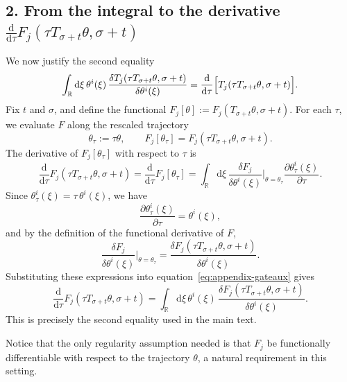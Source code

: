 \documentclass{article} %
\def\eqref#1{equation~\ref{#1}}
\begin{document}
\subsection*{2. From the integral to the derivative
$\frac{\mathrm{d}}{\mathrm{d}\tau}F_j(\tau T_{\sigma+t}\theta,\sigma+t)$}
We now justify the second equality
\[
\int_{\mathbb{R}} \mathrm{d}\xi \,
 \theta^i(\xi)\,
 \frac{\delta T_j(\tau T_{\sigma + t} \theta,\sigma+t)}{\delta \theta^i(\xi)}
 =
 \frac{\mathrm{d}}{\mathrm{d}\tau}
 \Bigl[T_j(\tau T_{\sigma + t}\theta, \sigma + t)\Bigr].
\]
Fix $t$ and $\sigma$, and define the functional $F_j[\theta] := F_j(T_{\sigma + t}\theta, \sigma + t).$ For each $\tau$, we evaluate $F$ along the rescaled trajectory
\[
\theta_\tau := \tau \theta, \qquad
F_j[\theta_\tau] = F_j(\tau T_{\sigma + t}\theta, \sigma + t).
\]
The derivative of $F_j[\theta_\tau]$ with respect to $\tau$ is
\begin{equation}
\frac{\mathrm{d}}{\mathrm{d}\tau} F_j(\tau T_{\sigma + t}\theta, \sigma + t)
=
\frac{\mathrm{d}}{\mathrm{d}\tau} F_j[\theta_\tau]
=
\int_{\mathbb{R}} \mathrm{d}\xi \,
\frac{\delta F_j}{\delta\theta^i(\xi)}\bigg|_{\theta=\theta_\tau}
\frac{\partial\theta_\tau^i(\xi)}{\partial\tau}.
\label{eq:appendix-gateaux}
\end{equation}
Since $\theta_\tau^i(\xi) = \tau\,\theta^i(\xi)$, we have
\[
\frac{\partial\theta_\tau^i(\xi)}{\partial\tau} = \theta^i(\xi),
\]
and by the definition of the functional derivative of $F$,
\[
\frac{\delta F_j}{\delta\theta^i(\xi)}\bigg|_{\theta=\theta_\tau}
=
\frac{\delta F_j(\tau T_{\sigma + t}\theta, \sigma + t)}{\delta\theta^i(\xi)}.
\]
Substituting these expressions into \eqref{eq:appendix-gateaux} gives
\begin{equation}
\frac{\mathrm{d}}{\mathrm{d}\tau} F_j(\tau T_{\sigma + t}\theta, \sigma + t)
=
\int_{\mathbb{R}} \mathrm{d}\xi \,
\theta^i(\xi)\,
\frac{\delta F_j(\tau T_{\sigma + t}\theta, \sigma + t)}{\delta\theta^i(\xi)}.
\label{eq:appendix-integral-derivative}
\end{equation}
This is precisely the second equality used in the main text.

Notice that the only regularity assumption needed is that $F_j$ be functionally differentiable with respect to the trajectory $\theta$, a natural requirement in this setting.



\end{document}
